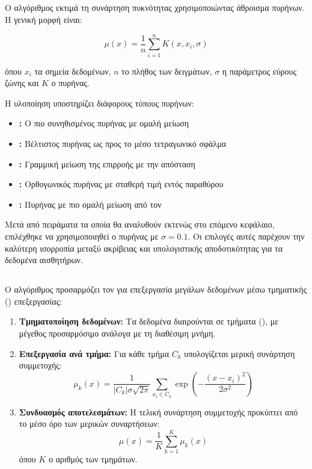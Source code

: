 \subsection{}
Ο αλγόριθμος  εκτιμά τη συνάρτηση πυκνότητας χρησιμοποιώντας άθροισμα πυρήνων. Η γενική μορφή είναι:

\[
\mu(x) = \frac{1}{n} \sum_{i=1}^{n} K(x, x_i, \sigma)
\]

όπου $x_i$ τα σημεία δεδομένων, $n$ το πλήθος των δειγμάτων, $\sigma$ η παράμετρος εύρους ζώνης και $K$ ο πυρήνας.

Η υλοποίηση υποστηρίζει διάφορους τύπους πυρήνων:
\begin{itemize}
    \item \textbf{:} Ο πιο συνηθισμένος πυρήνας με ομαλή μείωση
    \item \textbf{:} Βέλτιστος πυρήνας ως προς το μέσο τετραγωνικό σφάλμα
    \item \textbf{:} Γραμμική μείωση της επιρροής με την απόσταση
    \item \textbf{:} Ορθογωνικός πυρήνας με σταθερή τιμή εντός παραθύρου
    \item \textbf{:} Πυρήνας με πιο ομαλή μείωση από τον 
\end{itemize}

Μετά από πειράματα τα οποία θα αναλυθούν εκτενώς στο επόμενο κεφάλαιο, επιλέχθηκε να χρησιμοποιηθεί ο  πυρήνας με $\sigma = 0.1$. Οι επιλογές αυτές παρέχουν την καλύτερη ισορροπία μεταξύ ακρίβειας και υπολογιστικής αποδοτικότητας για τα δεδομένα αισθητήρων.

\subsection{}
Ο αλγόριθμος  προσαρμόζει τον  για επεξεργασία μεγάλων δεδομένων μέσω τμηματικής () επεξεργασίας:

\begin{enumerate}
    \item \textbf{Τμηματοποίηση δεδομένων:} Τα δεδομένα διαιρούνται σε τμήματα (), με μέγεθος προσαρμόσιμο ανάλογα με τη διαθέσιμη μνήμη.
    
    \item \textbf{Επεξεργασία ανά τμήμα:} Για κάθε τμήμα $C_k$ υπολογίζεται μερική συνάρτηση συμμετοχής:
    \[
    \mu_k(x) = \frac{1}{|C_k| \sigma \sqrt{2\pi}} \sum_{x_i \in C_k} \exp\left(-\frac{(x - x_i)^2}{2\sigma^2}\right)
    \]
    
    \item \textbf{Συνδυασμός αποτελεσμάτων:} Η τελική συνάρτηση συμμετοχής προκύπτει από το μέσο όρο των μερικών συναρτήσεων:
    \[
    \mu(x) = \frac{1}{K} \sum_{k=1}^{K} \mu_k(x)
    \]
    όπου $K$ ο αριθμός των τμημάτων.
\end{enumerate}

